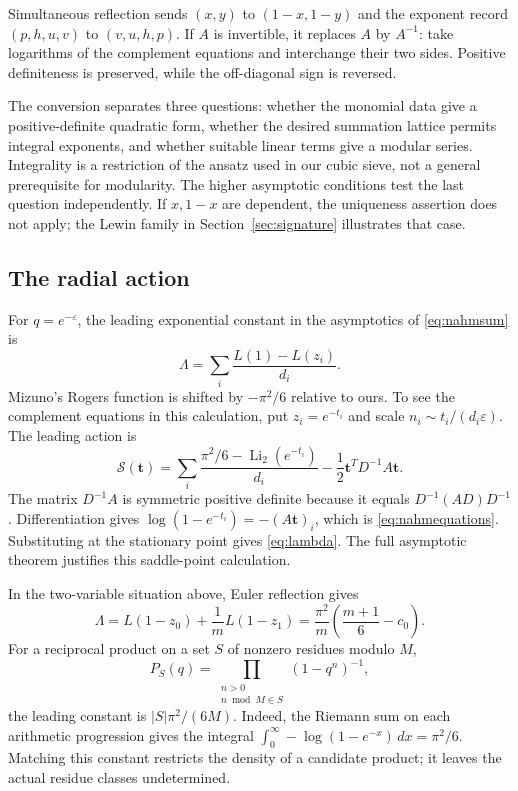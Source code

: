 \documentclass[11pt,reqno]{amsart}
\theoremstyle{remark}
\numberwithin{equation}{section}
\DeclareMathOperator{\Li}{Li}
\begin{document}
Simultaneous reflection sends $(x,y)$ to $(1-x,1-y)$ and the
exponent record $(p,h,u,v)$ to $(v,u,h,p)$. If $A$ is invertible,
it replaces $A$ by $A^{-1}$: take logarithms of the complement
equations and interchange their two sides. Positive definiteness is
preserved, while the off-diagonal sign is reversed.

The conversion separates three questions: whether the monomial data
give a positive-definite quadratic form, whether the desired summation
lattice permits integral exponents, and whether suitable linear terms
give a modular series. Integrality is a restriction of the ansatz used
in our cubic sieve, not a general prerequisite for modularity.
The higher asymptotic conditions test the last question independently.
If $x,1-x$ are dependent, the uniqueness assertion does not apply;
the Lewin family in Section~\ref{sec:signature} illustrates that case.

\subsection{The radial action}\label{sec:radial-action}
For $q=e^{-\varepsilon}$, the leading exponential constant in the
asymptotics of \eqref{eq:nahmsum} is \cite[Section~2]{Mizuno}
\begin{equation}\label{eq:lambda}
 \Lambda=\sum_i\frac{L(1)-L(z_i)}{d_i}.
\end{equation}
Mizuno's Rogers function is shifted by $-\pi^2/6$ relative to ours.
To see the complement equations in this calculation, put $z_i=e^{-t_i}$
and scale $n_i\sim t_i/(d_i\varepsilon)$. The leading action is
\[
 \mathcal S(\mathbf t)=
 \sum_i\frac{\pi^2/6-\Li_2(e^{-t_i})}{d_i}
 -\frac12\mathbf t^TD^{-1}A\mathbf t.
\]
The matrix $D^{-1}A$ is symmetric positive definite because it equals
$D^{-1}(AD)D^{-1}$. Differentiation gives
$\log(1-e^{-t_i})=-(A\mathbf t)_i$, which is
\eqref{eq:nahmequations}. Substituting at the stationary point gives
\eqref{eq:lambda}. The full asymptotic theorem justifies this saddle-point
calculation.

In the two-variable situation above, Euler reflection gives
\begin{equation}\label{eq:weightedlambda}
 \Lambda=L(1-z_0)+\frac1mL(1-z_1)
 =\frac{\pi^2}{m}\left(\frac{m+1}{6}-c_0\right).
\end{equation}
For a reciprocal product on a set $S$ of nonzero residues modulo $M$,
\[
 P_S(q)=\prod_{\substack{n>0\\n\bmod M\in S}}(1-q^n)^{-1},
\]
the leading constant is $|S|\pi^2/(6M)$. Indeed, the Riemann sum on each
arithmetic progression gives the integral
$\int_0^\infty-\log(1-e^{-x})\,dx=\pi^2/6$.
Matching this constant restricts the density of a candidate product; it
leaves the actual residue classes undetermined.
\end{document}
